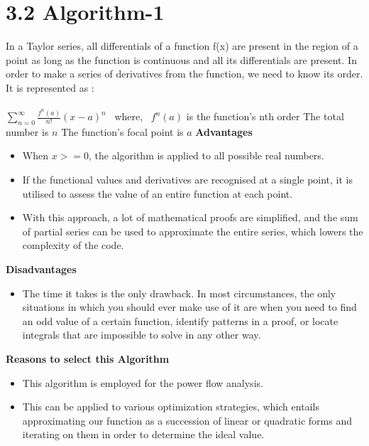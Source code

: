 \documentclass[12pt]{article}
\begin{document}
\section*{3.2 Algorithm-1 \cite{wiki_taylor}\cite{allmath_taylor}\cite{vedantu_taylor}\cite{quora_taylor}}
In a Taylor series, all differentials of a function f(x) are present in the region of a point as long as the function is continuous and all its differentials are present. In order to make a series of derivatives from the function, we need to know its order. 
It is represented as :\\~\\ 
$\sum_{n=0}^{\infty}\frac{f^{n}(a)}{n!}(x-a)^{n}$\
\newline
where,\
\newline
$f^{n}(a)$ is the function's nth order
\newline
The total number is $n$
\newline
The function's focal point is $a$
\newline
\textbf{Advantages}
\begin{itemize}
    \item When $x>=0$, the algorithm is applied to all possible real numbers.
    \item If the functional values and derivatives are recognised at a single point, it is utilised to assess the value of an entire function at each point.
    \item With this approach, a lot of mathematical proofs are simplified, and the sum of partial series can be used to approximate the entire series, which lowers the complexity of the code.
\end{itemize}

\textbf{Disadvantages}
\begin{itemize}
    \item The time it takes is the only drawback. In most circumstances, the only situations in which you should ever make use of it are when you need to find an odd value of a certain function, identify patterns in a proof, or locate integrals that are impossible to solve in any other way.
\end{itemize}

\textbf{Reasons to select this Algorithm}
\begin{itemize}
    \item This algorithm is employed for the power flow analysis.
    \item This can be applied to various optimization strategies, which entails approximating our function as a succession of linear or quadratic forms and iterating on them in order to determine the ideal value.
    
\end{itemize}
\end{document}
